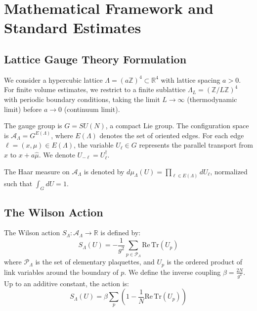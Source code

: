 \section{Mathematical Framework and Standard Estimates}
\label{sec:framework}


\subsection{Lattice Gauge Theory Formulation}
We consider a hypercubic lattice $\Lambda = (a\mathbb{Z})^4 \subset \mathbb{R}^4$ with lattice spacing $a > 0$. For finite volume estimates, we restrict to a finite sublattice $\Lambda_L = (\mathbb{Z}/L\mathbb{Z})^4$ with periodic boundary conditions, taking the limit $L \to \infty$ (thermodynamic limit) before $a \to 0$ (continuum limit).

The gauge group is $G = SU(N)$, a compact Lie group. The configuration space is $\mathcal{A}_\Lambda = G^{E(\Lambda)}$, where $E(\Lambda)$ denotes the set of oriented edges. For each edge $\ell = (x, \mu) \in E(\Lambda)$, the variable $U_\ell \in G$ represents the parallel transport from $x$ to $x + a\hat{\mu}$. We denote $U_{-\ell} = U_\ell^\dagger$.

The Haar measure on $\mathcal{A}_\Lambda$ is denoted by $d\mu_\Lambda(U) = \prod_{\ell \in E(\Lambda)} dU_\ell$, normalized such that $\int_G dU = 1$.

\subsection{The Wilson Action}
The Wilson action $S_\Lambda: \mathcal{A}_\Lambda \to \mathbb{R}$ is defined by:
\begin{equation}
S_\Lambda(U) = -\frac{1}{g^2} \sum_{p \in \mathcal{P}_\Lambda} \mathrm{Re}\,\mathrm{Tr}(U_p)
\end{equation}
where $\mathcal{P}_\Lambda$ is the set of elementary plaquettes, and $U_p$ is the ordered product of link variables around the boundary of $p$. We define the inverse coupling $\beta = \frac{2N}{g^2}$. Up to an additive constant, the action is:
\begin{equation}
S_\Lambda(U) = \beta \sum_{p} \left( 1 - \frac{1}{N} \mathrm{Re}\,\mathrm{Tr}(U_p) \right)
\end{equation}


